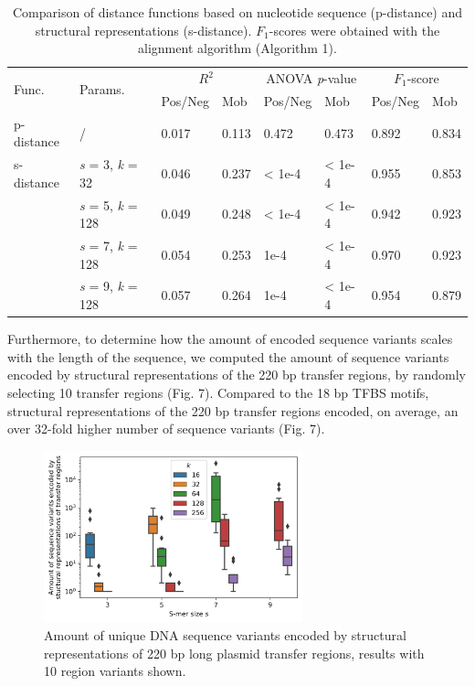 \documentclass[10pt]{article}
\begin{document}
\begin{table}
\footnotesize
  \caption{Comparison of distance functions based on nucleotide sequence (p-distance) and structural representations (s-distance). $F_1$-scores were obtained with the alignment algorithm (Algorithm 1).}
  \begin{tabular}{p{1.5cm}|p{1.1cm}|p{1.1cm}|p{1cm}|p{1.1cm}|p{1cm}|p{1.1cm}|p{1cm}}
  \hline
  \multirow{2}{*}{Func.} & 
  \multirow{2}{*}{Params.} & 
  \multicolumn{2}{c}{\textit{$R^2$}} & 
  \multicolumn{2}{c}{ANOVA \textit{p}-value} & 
  \multicolumn{2}{c}{$F_1$-score} \\
  \cline{3-8} & & Pos/Neg & Mob & Pos/Neg & Mob& Pos/Neg & Mob \\
  \hline
    p-distance & / & 0.017 & 0.113 & 0.472 & 0.473 & 0.892 & 0.834\\
    s-distance & \textit{s} = 3, \textit{k} = 32 & 0.046 & 0.237 & \textless{} 1e-4 & \textless{} 1e-4 & 0.955 & 0.853\\
     & \textit{s} = 5, \textit{k} = 128 & 0.049 & 0.248 & \textless{} 1e-4 & \textless{} 1e-4 & 0.942 & 0.923\\
     & \textit{s} = 7, \textit{k} = 128 & 0.054 & 0.253 & 1e-4 & \textless{} 1e-4 & 0.970 & 0.923\\
     & \textit{s} = 9, \textit{k} = 128 & 0.057 & 0.264 & 1e-4 & \textless{} 1e-4 & 0.954 & 0.879\\
  \hline
  \end{tabular}
\end{table}

Furthermore, to determine how the amount of encoded sequence variants scales with the length of the sequence, we computed the amount of sequence variants encoded by structural representations of the 220 bp transfer regions, by randomly selecting 10 transfer regions (Fig. 7). Compared to the 18 bp TFBS motifs, structural representations of the 220 bp transfer regions encoded, on average, an over 32-fold higher number of sequence variants (Fig. 7).

\begin{figure}[ht]
  \centering
  \includegraphics[width=7.5cm,keepaspectratio]{smer_fig_variants_orit.png}
  \caption{Amount of unique DNA sequence variants encoded by structural representations of 220 bp long plasmid transfer regions, results with 10 region variants shown.}
\end{figure}
\end{document}
